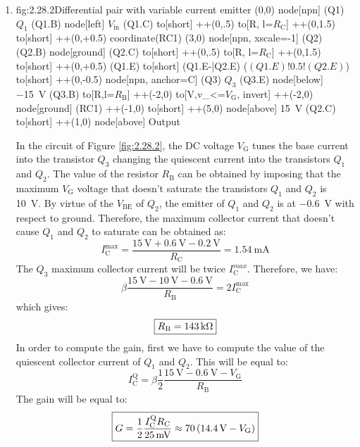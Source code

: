 \begin{enumerate}
    \item
    \begin{circuit}{fig:2.28.2}{Differential pair with variable current emitter}
        (0,0) node[npn] (Q1) {$Q_1$}
        (Q1.B) node[left] {$V_\text{in}$}
        (Q1.C) to[short] ++(0,.5)
        to[R, l=$R_\text{C}$] ++(0,1.5)
        to[short] ++(0,+0.5) coordinate(RC1)
        (3,0) node[npn, xscale=-1] (Q2) {}
        (Q2.B) node[ground] {}
        (Q2.C) to[short] ++(0,.5)
        to[R, l=$R_\text{C}$] ++(0,1.5)
        to[short] ++(0,+0.5)
        (Q1.E) to[short] (Q1.E-|Q2.E)
        ($(Q1.E)!0.5!(Q2.E)$) to[short] ++(0,-0.5)
        node[npn, anchor=C] (Q3) {$Q_3$}
        (Q3.E) node[below] {\SI{-15}{\volt}}
        (Q3.B) to[R,l=$R_\text{B}$] ++(-2,0)
        to[V,v_<=$V_\text{G}$, invert] ++(-2,0)
        node[ground] {}
        (RC1) ++(-1,0) to[short] ++(5,0)
        node[above] {\SI{+15}{\volt}}
        (Q2.C) to[short] ++(1,0)
        node[above] {Output}
    \end{circuit}
    In the circuit of Figure \ref{fig:2.28.2}, the DC voltage $V_\text{G}$ tunes the base current into the transistor $Q_3$ changing the quiescent current into the transistors $Q_1$ and $Q_2$.
    The value of the resistor $R_\text{B}$ can be obtained by imposing that the maximum $V_\text{G}$ voltage that doesn't saturate the transistors $Q_1$ and $Q_2$ is \SI{10}{\volt}. By virtue of the $V_\text{BE}$ of $Q_2$, the emitter of $Q_1$ and $Q_2$ is at \SI{-0.6}{\volt} with respect to ground. Therefore, the maximum collector current that doesn't cause $Q_1$ and $Q_2$ to saturate can be obtained as:
    \[I_\text{C}^\text{max}=\frac{\SI{15}{\volt}+\SI{0.6}{\volt}-\SI{0.2}{\volt}}{R_\text{C}}=\SI{1.54}{\milli\ampere}\]
    The $Q_3$ maximum collector current will be twice $I_\text{C}^{max}$. Therefore, we have:
    \[\beta\frac{\SI{15}{\volt}-\SI{10}{\volt}-\SI{0.6}{\volt}}{R_\text{B}}=2I_\text{C}^\text{max}\]
    which gives:
    \[\boxed{R_\text{B}=\SI{143}{\kilo\ohm}}\]
    In order to compute the gain, first we have to compute the value of the quiescent collector current of $Q_1$ and $Q_2$. This will be equal to:
    \[I_\text{C}^\text{Q}=\beta\frac{1}{2}\frac{\SI{15}{\volt}-\SI{0.6}{\volt}-V_\text{G}}{R_\text{B}}\]
    The gain will be equal to:
    \[\boxed{G=\frac{1}{2}\frac{I_\text{C}^\text{Q}R_\text{C}}{\SI{25}{\milli\volt}}\approx 70\left(\SI{14.4}{\volt}-V_\text{G}\right)}\]
\end{enumerate}

